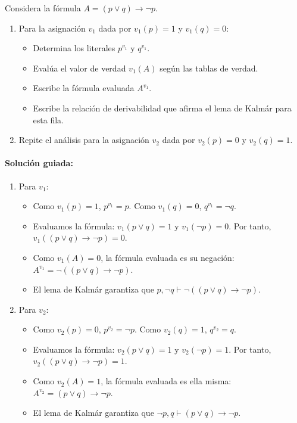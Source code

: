 \begin{pregunta}\label{e3-1}
Considera la fórmula $A = (p \lor q) \to \neg p$.
\begin{enumerate}
    \item Para la asignación $v_1$ dada por $v_1(p) = 1$ y $v_1(q) = 0$:
    \begin{itemize}
        \item Determina los literales $p^{v_1}$ y $q^{v_1}$.
        \item Evalúa el valor de verdad $v_1(A)$ según las tablas de verdad.
        \item Escribe la fórmula evaluada $A^{v_1}$.
        \item Escribe la relación de derivabilidad que afirma el lema de Kalmár para esta fila.
    \end{itemize}
    \item Repite el análisis para la asignación $v_2$ dada por $v_2(p) = 0$ y $v_2(q) = 1$.
\end{enumerate}

\paragraph{Solución guiada:}
\begin{enumerate}
    \item Para $v_1$:
    \begin{itemize}
        \item Como $v_1(p) = 1$, $p^{v_1} = p$. Como $v_1(q) = 0$, $q^{v_1} = \neg q$.
        \item Evaluamos la fórmula: $v_1(p \lor q) = 1$ y $v_1(\neg p) = 0$. Por tanto, $v_1((p \lor q) \to \neg p) = 0$.
        \item Como $v_1(A) = 0$, la fórmula evaluada es su negación: $A^{v_1} = \neg((p \lor q) \to \neg p)$.
        \item El lema de Kalmár garantiza que $p, \neg q \vdash \neg((p \lor q) \to \neg p)$.
    \end{itemize}
    \item Para $v_2$:
    \begin{itemize}
        \item Como $v_2(p) = 0$, $p^{v_2} = \neg p$. Como $v_2(q) = 1$, $q^{v_2} = q$.
        \item Evaluamos la fórmula: $v_2(p \lor q) = 1$ y $v_2(\neg p) = 1$. Por tanto, $v_2((p \lor q) \to \neg p) = 1$.
        \item Como $v_2(A) = 1$, la fórmula evaluada es ella misma: $A^{v_2} = (p \lor q) \to \neg p$.
        \item El lema de Kalmár garantiza que $\neg p, q \vdash (p \lor q) \to \neg p$.
    \end{itemize}
\end{enumerate}

\end{pregunta}

